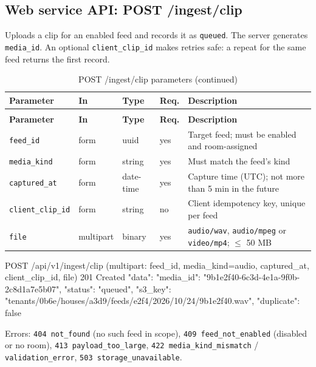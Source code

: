\subsection{Web service API: POST /ingest/clip}
Uploads a clip for an enabled feed and records it as \texttt{queued}. The server generates \texttt{media\_id}.
An optional \texttt{client\_clip\_id} makes retries safe: a repeat for the same feed returns the first record.
\begin{longtable}{L{2.8cm}L{1.6cm}L{1.6cm}L{1.1cm}L{6.8cm}}
\caption{POST /ingest/clip parameters}\\
\toprule
\textbf{Parameter} & \textbf{In} & \textbf{Type} & \textbf{Req.} & \textbf{Description} \\
\midrule
\endfirsthead
\caption[]{POST /ingest/clip parameters (continued)}\\
\toprule
\textbf{Parameter} & \textbf{In} & \textbf{Type} & \textbf{Req.} & \textbf{Description} \\
\midrule
\endhead
\texttt{feed\_id} & form & uuid & yes & Target feed; must be enabled and room-assigned \\
\texttt{media\_kind} & form & string & yes & Must match the feed's kind \\
\texttt{captured\_at} & form & date-time & yes & Capture time (UTC); not more than 5 min in the future \\
\texttt{client\_clip\_id} & form & string & no & Client idempotency key, unique per feed \\
\texttt{file} & multipart & binary & yes & \texttt{audio/wav}, \texttt{audio/mpeg} or \texttt{video/mp4}; $\le$ 50 MB \\
\bottomrule
\end{longtable}
\begin{Shaded}
\begin{Code}
POST /api/v1/ingest/clip   (multipart: feed_id, media_kind=audio, captured_at, client_clip_id, file)
201 Created { "data": { "media_id": "9b1e2f40-6c3d-4e1a-9f0b-2c8d1a7e5b07", "status": "queued",
                        "s3_key": "tenants/0b6e/houses/a3d9/feeds/e2f4/2026/10/24/9b1e2f40.wav",
                        "duplicate": false } }
\end{Code}
\end{Shaded}
\noindent Errors: \texttt{404 not\_found} (no such feed in scope), \texttt{409 feed\_not\_enabled} (disabled or no room),
\texttt{413 payload\_too\_large}, \texttt{422 media\_kind\_mismatch} / \texttt{validation\_error}, \texttt{503 storage\_unavailable}.

